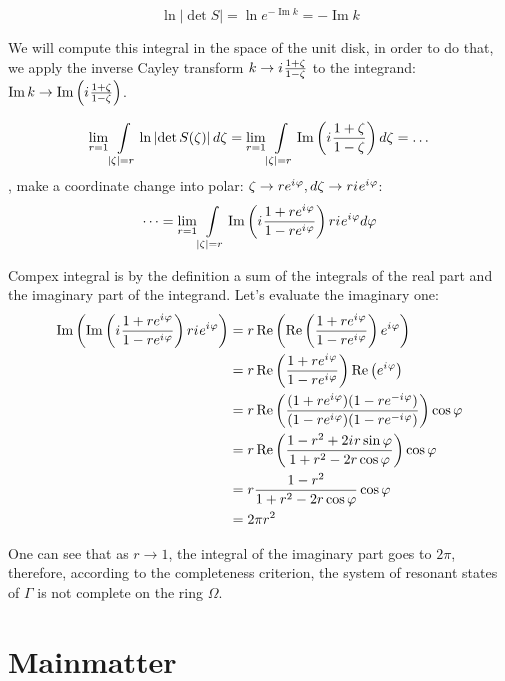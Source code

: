 \documentclass{birkjour}
\theoremstyle{definition}
\theoremstyle{remark}
\numberwithin{equation}{section}
\newcommand{\eexp}[1]{e^{#1}}
\newcommand{\iu}{{i\mkern1mu}}
\renewcommand{\Re}{\operatorname{Re}}
\renewcommand{\Im}{\operatorname{Im}}
\renewcommand{\phi}{\varphi}
\begin{document}
\[
\ln \left|{\det S}\right| = \ln \eexp{- \Im k} = -\Im k
\]

We will compute this integral in the space of the unit disk, in order to do that, we apply the inverse Cayley transform $k \to \iu \frac{1 + \zeta}{1 - \zeta}$ to the integrand: $\Im k \to \Im \left( \iu \frac{1 + \zeta}{1 - \zeta} \right) $.

\[
  \lim\limits_{r = 1} \int\limits_{\left|\zeta\right| = r} \ln \left|\det S(\zeta)\right| d \zeta
= \lim\limits_{r = 1} \int\limits_{\left|\zeta\right| = r} \Im \left( \iu \frac{1 + \zeta}{1 - \zeta} \right)  d\zeta = \dots
\]
, make a coordinate change into polar: $\zeta \to r \eexp{\iu \phi}, d\zeta \to r \iu \eexp{\iu \phi}$:
\[
\dots = \lim\limits_{r = 1} \int\limits_{\left|\zeta\right| = r} \Im \left( \iu \frac{1 + r \eexp{\iu \phi}}{1 - r \eexp{\iu \phi}} \right) r \iu \eexp{\iu \phi} d\phi
\]

Compex integral is by the definition a sum of the integrals of the real part and the imaginary part of the integrand. Let's evaluate the imaginary one:
\begin{align*}
\Im \left(  \Im \left( \iu \frac{1 + r \eexp{\iu \phi}}{1 - r \eexp{\iu \phi}} \right) r \iu \eexp{\iu \phi} \right)
 &= r \Re \left(  \Re \left( \frac{1 + r \eexp{\iu \phi}}{1 - r \eexp{\iu \phi}} \right) \eexp{\iu \phi} \right) \\
 &= r \Re \left( \frac{1 + r \eexp{\iu \phi}}{1 - r \eexp{\iu \phi}} \right) \Re \left(   \eexp{\iu \phi} \right) \\
 &= r \Re \left( \frac{(1 + r \eexp{\iu \phi}) (1 - r \eexp{-\iu \phi}) }{(1 - r \eexp{\iu \phi}) (1 - r \eexp{-\iu \phi})} \right) \cos \phi \\
 &= r \Re \left( \frac{1 - r^2 + 2 \iu r \sin \phi}{1 + r^2 - 2 r \cos \phi} \right) \cos \phi \\
 &= r \frac{1 - r^2}{1 + r^2 - 2 r \cos \phi} \cos \phi \\
 &= 2 \pi r^2
\end{align*}

One can see that as $r \to 1$, the integral of the imaginary part goes to $2 \pi$, therefore, according to the completeness criterion, the system of resonant states of $\Gamma$ is not complete on the ring $\Omega$.

\section{Mainmatter}
\end{document}
